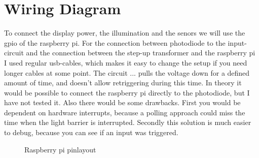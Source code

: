 \documentclass[11pt, a4paper, UKenglish, parskip=half+]{scrbook}
\begin{document}
\section{Wiring Diagram}
To connect the display power, the illumination and the senors we will use the gpio of the raspberry pi. For the connection between photodiode to the input-circuit and the connection between the step-up transformer and the raspberry pi I used regular usb-cables, which makes it easy to change the setup if you need longer cables at some point. The circuit ... pulls the voltage down for a defined amount of time, and doesn't allow retriggering during this time. In theory it would be possible to connect the raspberry pi directly to the photodiode, but I have not tested it. Also there would be some drawbacks. First you would be dependent on hardware interrupts, because a polling approach could miss the time when the light barrier is interrupted. Secondly this solution is much easier to debug, because you can see if an input was triggered.
\begin{wrapfigure}{r}{0.4\textwidth}
\caption{Raspberry pi pinlayout}	
\end{wrapfigure}
\end{document}
